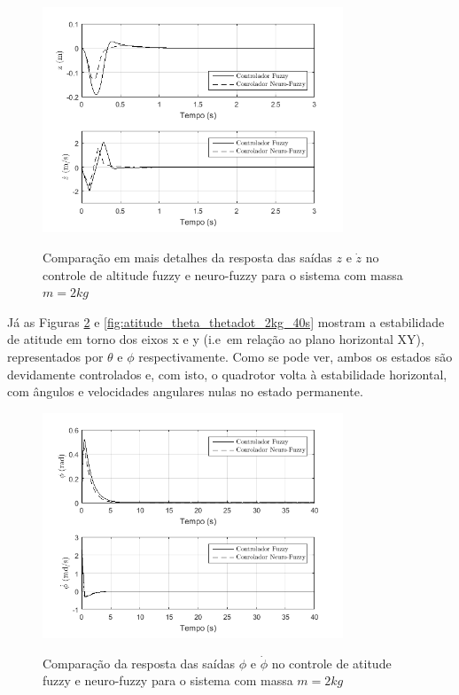 \begin{figure}[!htb]
    \centering
    \caption{Comparação em mais detalhes da resposta das saídas $z$ e $\dot{z}$ no controle de altitude fuzzy e neuro-fuzzy para o sistema com massa $m=2kg$}
    \includegraphics[width=0.8\textwidth]{./04-figuras/resultados/novos/altitude_z_zdot_2kg_closer}
    \label{fig:altitude_z_zdot_2kg_closer}
\end{figure}


Já as Figuras \ref{fig:atitude_phi_phidot_2kg_40s} e \ref{fig:atitude_theta_thetadot_2kg_40s} mostram a estabilidade de atitude em torno dos eixos x e y (i.e\ em relação ao plano horizontal XY), representados por $\theta$ e $\phi$ respectivamente. Como se pode ver, ambos os estados são devidamente controlados e, com isto, o quadrotor volta à estabilidade horizontal, com ângulos e velocidades angulares nulas no estado permanente.

\begin{figure}[!htb]
    \centering
    \caption{Comparação da resposta das saídas $\phi$ e $\dot{\phi}$ no controle de atitude fuzzy e neuro-fuzzy para o sistema com massa $m=2kg$}
    \includegraphics[width=0.8\textwidth]{./04-figuras/resultados/novos/atitude_phi_phidot_2kg_40s}
    \label{fig:atitude_phi_phidot_2kg_40s}
\end{figure}

